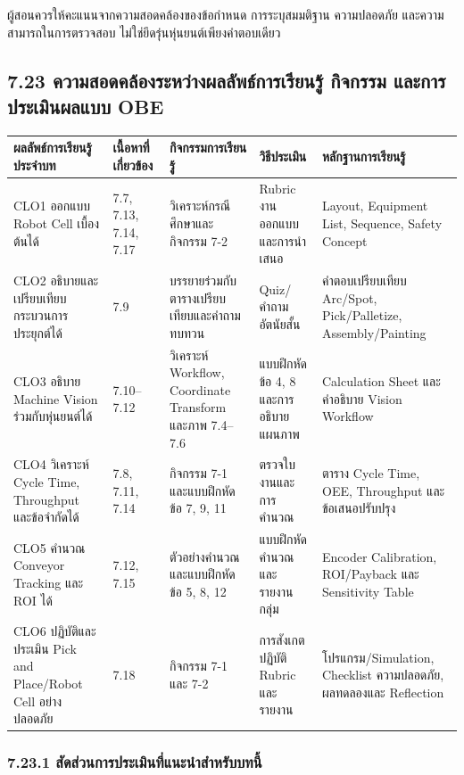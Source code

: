 ผู้สอนควรให้คะแนนจากความสอดคล้องของข้อกำหนด การระบุสมมติฐาน ความปลอดภัย และความสามารถในการตรวจสอบ ไม่ใช่ยึดรุ่นหุ่นยนต์เพียงคำตอบเดียว


\subsection{7.23 ความสอดคล้องระหว่างผลลัพธ์การเรียนรู้ กิจกรรม และการประเมินผลแบบ OBE}

\begin{table}[htbp]
    \centering
    \scriptsize
    \begin{tabularx}{\textwidth}{L{0.20\textwidth} L{0.13\textwidth} Y Y Y}
        \hline
        \textbf{ผลลัพธ์การเรียนรู้ประจำบท} & \textbf{เนื้อหาที่เกี่ยวข้อง} & \textbf{กิจกรรมการเรียนรู้} & \textbf{วิธีประเมิน} & \textbf{หลักฐานการเรียนรู้} \\
        \hline
        CLO1 ออกแบบ Robot Cell เบื้องต้นได้ & 7.7, 7.13, 7.14, 7.17 & วิเคราะห์กรณีศึกษาและกิจกรรม 7-2 & Rubric งานออกแบบและการนำเสนอ & Layout, Equipment List, Sequence, Safety Concept \\
        CLO2 อธิบายและเปรียบเทียบกระบวนการประยุกต์ได้ & 7.9 & บรรยายร่วมกับตารางเปรียบเทียบและคำถามทบทวน & Quiz/คำถามอัตนัยสั้น & คำตอบเปรียบเทียบ Arc/Spot, Pick/Palletize, Assembly/Painting \\
        CLO3 อธิบาย Machine Vision ร่วมกับหุ่นยนต์ได้ & 7.10–7.12 & วิเคราะห์ Workflow, Coordinate Transform และภาพ 7.4–7.6 & แบบฝึกหัดข้อ 4, 8 และการอธิบายแผนภาพ & Calculation Sheet และคำอธิบาย Vision Workflow \\
        CLO4 วิเคราะห์ Cycle Time, Throughput และข้อจำกัดได้ & 7.8, 7.11, 7.14 & กิจกรรม 7-1 และแบบฝึกหัดข้อ 7, 9, 11 & ตรวจใบงานและการคำนวณ & ตาราง Cycle Time, OEE, Throughput และข้อเสนอปรับปรุง \\
        CLO5 คำนวณ Conveyor Tracking และ ROI ได้ & 7.12, 7.15 & ตัวอย่างคำนวณและแบบฝึกหัดข้อ 5, 8, 12 & แบบฝึกหัดคำนวณและรายงานกลุ่ม & Encoder Calibration, ROI/Payback และ Sensitivity Table \\
        CLO6 ปฏิบัติและประเมิน Pick and Place/Robot Cell อย่างปลอดภัย & 7.18 & กิจกรรม 7-1 และ 7-2 & การสังเกตปฏิบัติ Rubric และรายงาน & โปรแกรม/Simulation, Checklist ความปลอดภัย, ผลทดลองและ Reflection \\
        \hline
    \end{tabularx}
\end{table}

\subsubsection{7.23.1 สัดส่วนการประเมินที่แนะนำสำหรับบทนี้}

